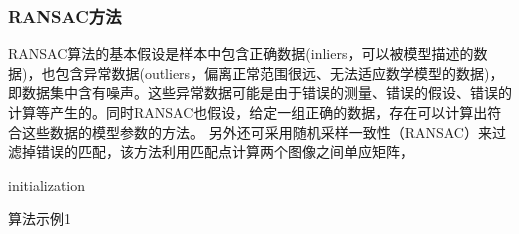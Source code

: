 \subsubsection{RANSAC方法}
RANSAC算法的基本假设是样本中包含正确数据(inliers，可以被模型描述的数据)，也包含异常数据(outliers，偏离正常范围很远、无法适应数学模型的数据)，即数据集中含有噪声。这些异常数据可能是由于错误的测量、错误的假设、错误的计算等产生的。同时RANSAC也假设，给定一组正确的数据，存在可以计算出符合这些数据的模型参数的方法。
另外还可采用随机采样一致性（RANSAC）来过滤掉错误的匹配，该方法利用匹配点计算两个图像之间单应矩阵，
\begin{algorithm}[htb]
	\small
	\SetAlgoLined
	
	initialization\;
	\caption{算法示例1}
	\label{algo:algorithm2}
\end{algorithm}













